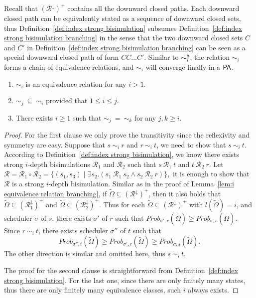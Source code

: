 \documentclass{LMCS}
\def\tilde{\widetilde}
\newcommand{\PA}{{\sf PA}}
\newcommand{\iBS}[1]{\sim_{#1}}
\newcommand{\iBSB}[1]{\sim_{#1}^{{\sf b}}}
\newcommand{\MC}[1]{\mathcal{#1}}
\newcommand{\MEASURE}{\mathit{Prob}}
\newcommand{\DOWNWARD}[2]{#1^{\downarrow}#2}
\begin{document}
Recall that $(\DOWNWARD{\MC{R}}{})^+$ contains all the downward
closed paths. Each downward closed path can be equivalently stated as
a sequence of downward closed sets, thus Definition~\ref{def:index
  strong bisimulation} subsumes Definition~\ref{def:index strong
  bisimulation branching} in the sense that the two downward closed
sets $C$ and $C'$ in Definition~\ref{def:index strong bisimulation
  branching} can be seen as a special downward closed path of form
$CC\ldots C'$. Similar to $\iBSB{i}$, the relation $\iBS{i}$ forms a
chain of equivalence relations, and $\iBS{i}$ will converge finally in
a $\PA$.

\begin{lem}\label{lem:i equivalence relation}\hfill
\begin{enumerate}[\em(1)]
\item $\iBS{i}$ is an equivalence relation for any $i> 1$.
\item $\iBS{j}~\subseteq~\iBS{i}$ provided that $1\leq i \leq j$.
\item There exists $i\geq 1$ such that $\iBS{j}~=~\iBS{k}$ for any $j,k\geq i$.
\end{enumerate}
\end{lem}
\begin{proof}
For the first clause we only prove the transitivity since the reflexivity and
  symmetry are easy. Suppose that $s~\iBS{i}~r$ and $r~\iBS{i}~t$, we
  need to show that $s~\iBS{i}~t$. According to
  Definition~\ref{def:index strong bisimulation}, we know there exists
  strong $i$-depth bisimulations $\MC{R}_1$ and $\MC{R}_2$ such that
  $s~\MC{R}_1~t$ and
  $t~\MC{R}_2~r$. Let $\MC{R}=\MC{R}_1\circ\MC{R}_2=\{(s_1,s_3)\mid\exists
  s_2.(s_1~\MC{R}_1~s_2\land s_2~\MC{R}_2~r)\},$ it is enough to show
  that $\MC{R}$ is a strong $i$-depth bisimulation. Similar as in the
  proof of Lemma~\ref{lem:i equivalence relation branching}, if
  $\tilde{\Omega}\subseteq (\DOWNWARD{\MC{R}}{})^+$, then it also
  holds that $\tilde{\Omega}\subseteq (\DOWNWARD{\MC{R}_1}{})^+$ and
  $\tilde{\Omega}\subseteq (\DOWNWARD{\MC{R}_2}{})^+$. Thus for each
  $\tilde{\Omega}\subseteq (\DOWNWARD{\MC{R}}{})^+$ with
  $l(\tilde{\Omega})=i$, and scheduler $\sigma$ of $s$, there exists
  $\sigma'$ of $r$ such that
  $\MEASURE_{\sigma',r}(\tilde{\Omega})\geq\MEASURE_{\sigma,s}(\tilde{\Omega})$. Since
  $r~\iBS{i}~t$, there exists scheduler $\sigma''$ of $t$ such that
    $$\MEASURE_{\sigma'',t}(\tilde{\Omega})\geq\MEASURE_{\sigma',r}(\tilde{\Omega})\geq\MEASURE_{\sigma,s}(\tilde{\Omega}).$$ The other direction is similar and omitted here, thus $s~\iBS{i}~t$.

The proof for the second clause  is straightforward from Definition~\ref{def:index strong bisimulation}. For the last one,
since there are only finitely many states, thus there are only
  finitely many equivalence classes, such $i$ always exists.
\end{proof}
\end{document}
